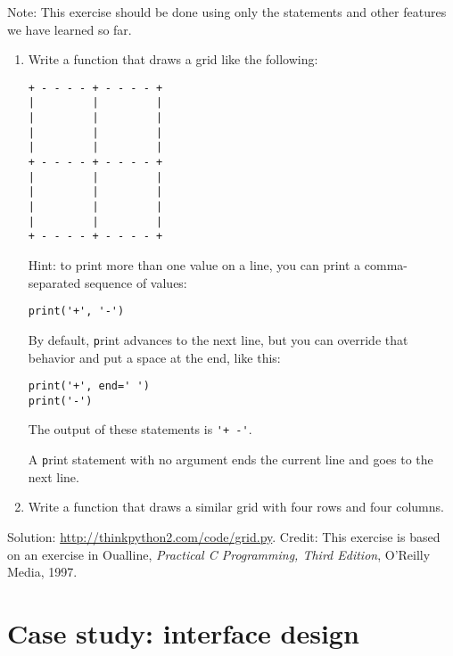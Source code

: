 \documentclass[
DIV=11,
fontsize=13,
twoside,
headinclude=false,
titlepage=firstiscover,
abstract=true,
headsepline=true,
footsepline=true,
chapterprefix=true, %
headings=big,
bibliography=totoc,%
captions=tableheading
]{scrbook}
\theoremstyle{definition}
\begin{document}
\begin{exercise}
\normalfont

Note: This exercise should be
done using only the statements and other features we have learned so
far.  

\begin{enumerate}

\item Write a function that draws a grid like the following:

\begin{lstlisting}
+ - - - - + - - - - +
|         |         |
|         |         |
|         |         |
|         |         |
+ - - - - + - - - - +
|         |         |
|         |         |
|         |         |
|         |         |
+ - - - - + - - - - +
\end{lstlisting}
%
Hint: to print more than one value on a line, you can print
a comma-separated sequence of values:

\begin{lstlisting}
print('+', '-')
\end{lstlisting}
%
By default, {\texttt print} advances to the next line, but you
can override that behavior and put a space at the end, like this:

\begin{lstlisting}
print('+', end=' ')
print('-')
\end{lstlisting}
%
The output of these statements is \verb"'+ -'".

A {\texttt print} statement with no argument ends the current line and
goes to the next line.

\item Write a function that draws a similar grid
with four rows and four columns.

\end{enumerate}

Solution: \url{http://thinkpython2.com/code/grid.py}.
Credit: This exercise is based on an exercise in Oualline, {\em
    Practical C Programming, Third Edition}, O'Reilly Media, 1997.

\end{exercise}





\chapter{Case study: interface design}
\label{turtlechap}
\end{document}
